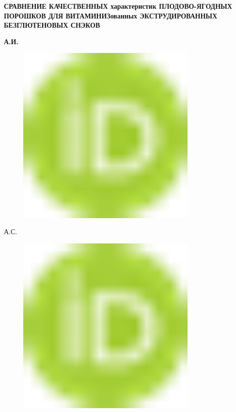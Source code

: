 
{\bfseries СРАВНЕНИЕ КАЧЕСТВЕННЫХ характеристик ПЛОДОВО-ЯГОДНЫХ ПОРОШКОВ
ДЛЯ ВИТАМИНИЗованных ЭКСТРУДИРОВАННЫХ БЕЗГЛЮТЕНОВЫХ СНЭКОВ}

{\bfseries А.И.
\begin{figure}[H]
	\centering
	\includegraphics[width=0.8\textwidth]{media/pish2/image1}
	\caption*{}
\end{figure}

А.С.
\begin{figure}[H]
	\centering
	\includegraphics[width=0.8\textwidth]{media/pish2/image1}
	\caption*{}
\end{figure}

}
